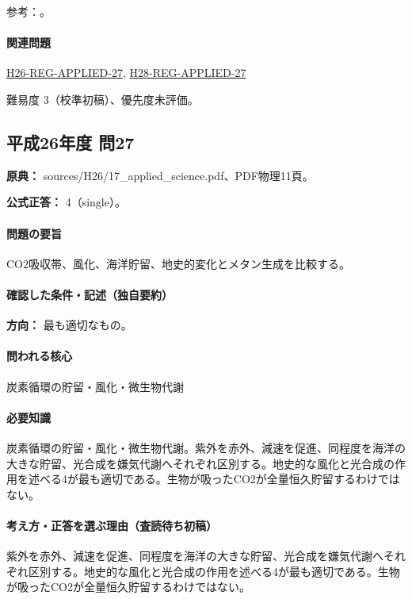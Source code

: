 \par 参考：\cite{gc_carbon,atm_noaa_ghg}。

\paragraph{関連問題} \hyperref[q:h26-reg-applied-27]{H26-REG-APPLIED-27}, \hyperref[q:h28-reg-applied-27]{H28-REG-APPLIED-27}

\par 難易度 3（校準初稿）、優先度未評価。

\subsection{平成26年度 問27}
\label{q:h26-reg-applied-27}

\noindent\textbf{原典：} sources/H26/17\_applied\_science.pdf、PDF物理11頁。

\textbf{公式正答：} 4（single）。

\paragraph{問題の要旨} CO2吸収帯、風化、海洋貯留、地史的変化とメタン生成を比較する。

\paragraph{確認した条件・記述（独自要約）}\mbox{}\par

\noindent\textbf{方向：} 最も適切なもの。\par

\paragraph{問われる核心} 炭素循環の貯留・風化・微生物代謝

\paragraph{必要知識} 炭素循環の貯留・風化・微生物代謝。紫外を赤外、減速を促進、同程度を海洋の大きな貯留、光合成を嫌気代謝へそれぞれ区別する。地史的な風化と光合成の作用を述べる4が最も適切である。生物が吸ったCO2が全量恒久貯留するわけではない。

\paragraph{考え方・正答を選ぶ理由（査読待ち初稿）} 紫外を赤外、減速を促進、同程度を海洋の大きな貯留、光合成を嫌気代謝へそれぞれ区別する。地史的な風化と光合成の作用を述べる4が最も適切である。生物が吸ったCO2が全量恒久貯留するわけではない。

